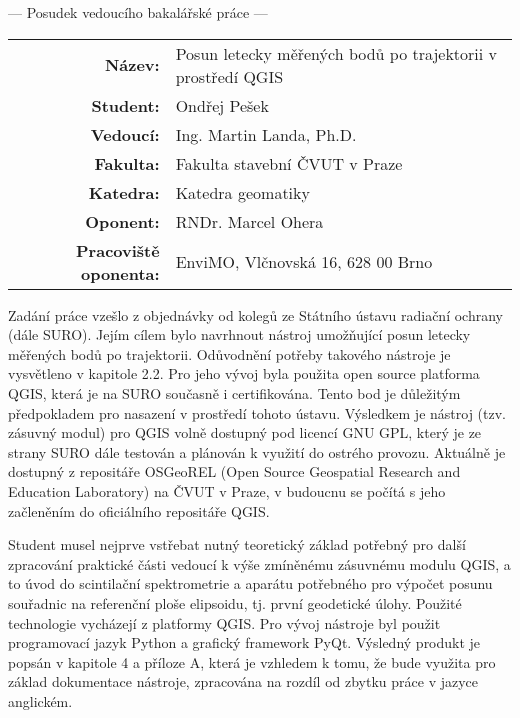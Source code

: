 \documentclass[czech,11pt,a4paper]{article}
\begin{document}
\begin{center}
  {\Large --- Posudek vedoucího bakalářské práce ---}
\end{center}

\vspace{.2cm}

\noindent \begin{tabular}{rp{}}
  {\bf Název:} & Posun letecky měřených bodů po trajektorii v prostředí QGIS \\
  {\bf Student:} & Ondřej Pešek \\
  {\bf Vedoucí:} & Ing. Martin Landa, Ph.D. \\
  {\bf Fakulta:} & Fakulta stavební ČVUT v Praze \\ 
  {\bf Katedra:} & Katedra geomatiky \\
  {\bf Oponent:} & RNDr. Marcel Ohera \\
  {\bf Pracoviště oponenta:} & EnviMO, Vlčnovská 16, 628 00 Brno \\
\end{tabular}

\vspace{1cm}

Zadání práce vzešlo z objednávky od kolegů ze Státního ústavu radiační
ochrany (dále SURO). Jejím cílem bylo navrhnout nástroj umožňující
posun letecky měřených bodů po trajektorii. Odůvodnění potřeby
takového nástroje je vysvětleno v kapitole 2.2. Pro jeho vývoj byla
použita open source platforma QGIS, která je na SURO současně i
certifikována. Tento bod je důležitým předpokladem pro nasazení v
prostředí tohoto ústavu. Výsledkem je nástroj (tzv. zásuvný modul) pro
QGIS volně dostupný pod licencí GNU GPL, který je ze strany SURO dále
testován a plánován k využití do ostrého provozu. Aktuálně je dostupný
z repositáře OSGeoREL (Open Source Geospatial Research and Education
Laboratory) na ČVUT v Praze, v budoucnu se počítá s jeho začleněním do
oficiálního repositáře QGIS. \newline

Student musel nejprve vstřebat nutný teoretický základ potřebný pro
další zpracování praktické části vedoucí k výše zmíněnému zásuvnému
modulu QGIS, a to úvod do scintilační spektrometrie a aparátu
potřebného pro výpočet posunu souřadnic na referenční ploše elipsoidu,
tj. první geodetické úlohy. Použité technologie vycházejí z platformy
QGIS. Pro vývoj nástroje byl použit programovací jazyk Python a
grafický framework PyQt. Výsledný produkt je popsán v kapitole 4 a
příloze A, která je vzhledem k tomu, že bude využita pro základ
dokumentace nástroje, zpracována na rozdíl od zbytku práce v jazyce
anglickém. \newline
\end{document}
